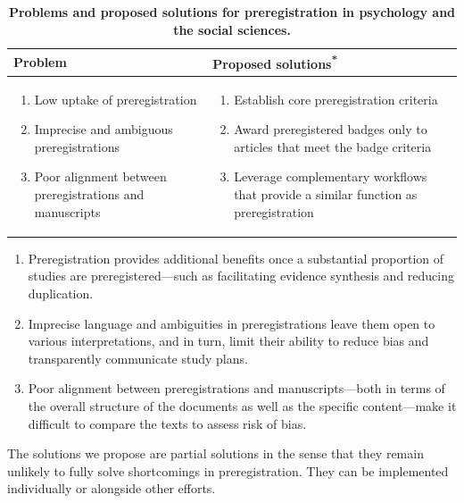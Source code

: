 \documentclass[authordate, meta, issue]{jote-new-article}
\begin{document}
\begin{table}
  \begin{fullwidth}

    \caption[ashtash]{ \textbf{Problems and proposed solutions for preregistration in psychology and the social sciences. }}
    \begin{tabularx}{\textwidth}{@{} >{\arraybackslash\RaggedRight}X  >{\arraybackslash\RaggedRight}X @{}}
      \toprule
      \textbf{Problem} &
      \textbf{Proposed solutions}\textsuperscript{\textbf{*}}
      \\
      \midrule

      \begin{enumerate}
        \item Low uptake of preregistration
        \item Imprecise and ambiguous preregistrations
        \item Poor alignment between preregistrations and manuscripts
      \end{enumerate}
                       &

      {
          \renewcommand{\theenumi}{\Alph{enumi}}
          \begin{enumerate}

            \item  Establish core preregistration criteria
            \item      Award preregistered badges only to articles that meet the badge criteria
            \item Leverage complementary workflows that provide a similar function as preregistration
          \end{enumerate}}
      \\
      \bottomrule
    \end{tabularx}
    {\small \RaggedRight

    \begin{enumerate}
      \item Preregistration provides additional benefits once a substantial proportion of studies are preregistered—such as facilitating evidence synthesis and reducing duplication.
      \item Imprecise language and ambiguities in preregistrations leave them open to various interpretations, and in turn, limit their ability to reduce bias and transparently communicate study plans.
      \item Poor alignment between preregistrations and manuscripts—both in terms of the overall structure of the documents as well as the specific content—make it difficult to compare the texts to assess risk of bias.
    \end{enumerate}
    The solutions we propose are partial solutions in the sense that they remain unlikely to fully solve shortcomings in preregistration. They can be implemented individually or alongside other efforts.

}
\end{fullwidth}
\end{table}
\end{document}
